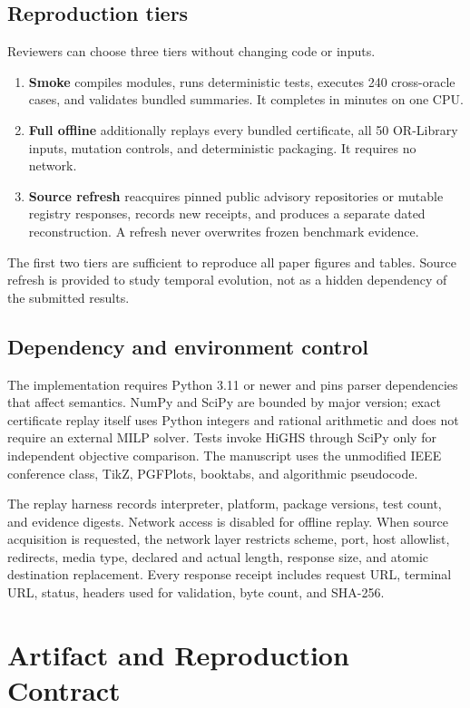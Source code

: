 \documentclass[10pt,conference]{IEEEtran}
\begin{document}
\subsection{Reproduction tiers}
Reviewers can choose three tiers without changing code or inputs.
\begin{enumerate}
  \item \textbf{Smoke} compiles modules, runs deterministic tests, executes 240 cross-oracle cases, and validates bundled summaries. It completes in minutes on one CPU.
  \item \textbf{Full offline} additionally replays every bundled certificate, all 50 OR-Library inputs, mutation controls, and deterministic packaging. It requires no network.
  \item \textbf{Source refresh} reacquires pinned public advisory repositories or mutable registry responses, records new receipts, and produces a separate dated reconstruction. A refresh never overwrites frozen benchmark evidence.
\end{enumerate}

The first two tiers are sufficient to reproduce all paper figures and tables. Source refresh is provided to study temporal evolution, not as a hidden dependency of the submitted results.

\subsection{Dependency and environment control}
The implementation requires Python 3.11 or newer and pins parser dependencies that affect semantics. NumPy and SciPy are bounded by major version; exact certificate replay itself uses Python integers and rational arithmetic and does not require an external MILP solver. Tests invoke HiGHS through SciPy only for independent objective comparison. The manuscript uses the unmodified IEEE conference class, TikZ, PGFPlots, booktabs, and algorithmic pseudocode.

The replay harness records interpreter, platform, package versions, test count, and evidence digests. Network access is disabled for offline replay. When source acquisition is requested, the network layer restricts scheme, port, host allowlist, redirects, media type, declared and actual length, response size, and atomic destination replacement. Every response receipt includes request URL, terminal URL, status, headers used for validation, byte count, and SHA-256.

\section{Artifact and Reproduction Contract}
\end{document}
